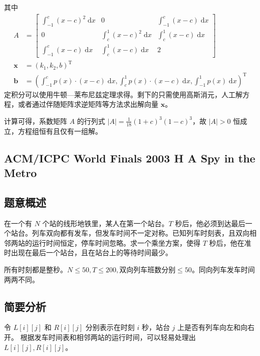 \documentclass{ctexartutf8}
\numberwithin{theorem}{section}
\numberwithin{theorem}{subsection}
\begin{document}
			其中
			\begin{align}
				A & = \begin{bmatrix}
					 \int_{-1}^{c} (x-c)^2 \; \mathrm{d}x & 0 & \int_{-1}^{c} (x-c) \; \mathrm{d}x \\
					0 & \int_{c}^{1} (x-c)^2 \; \mathrm{d}x & \int_{c}^{1} (x-c) \; \mathrm{d}x \\
					\int_{-1}^{c} (x-c) \; \mathrm{d}x & \int_{c}^{1} (x-c) \; \mathrm{d}x & 2
				\end{bmatrix} \\
				\mathbf{x} & = (k_1,k_2,b)^{\mathrm{T}} \\
				\mathbf{b} & = \left(\int_{-1}^{c} p(x)\cdot(x-c) \; \mathrm{d}x,
					\int_{c}^{1} p(x)\cdot(x-c) \; \mathrm{d}x,
					\int_{-1}^{1} p(x) \; \mathrm{d}x\right)^{\mathrm{T}}
			\end{align}
			定积分可以使用牛顿—莱布尼兹定理求得。剩下的只需使用高斯消元，人工解方程，或者通过伴随矩阵求逆矩阵等方法求出解向量 $\mathbf{x}$。
			
			计算可得，系数矩阵 $A$ 的行列式 $\left|A\right| = \textstyle \frac{1}{18} (1+c)^3 (1-c)^3 $，故 $\left|A\right|  > 0 $ 恒成立，方程组恒有且仅有一组解。
			
		
	\subsection{ACM/ICPC World Finals 2003 H A Spy in the Metro}
		\subsection{题意概述}
			在一个有 $N$ 个站的线形地铁里，某人在第一个站台。$T$ 秒后，他必须到达最后一个站台。列车双向都有发车，但发车时间不一定对称。已知列车时刻表，且双向相邻两站的运行时间恒定，停车时间忽略。求一个乘坐方案，使得 $T$ 秒后，他在准时出现在最后一个站台，且在站台上的等待时间最少。
			
			所有时刻都是整秒。$N \le 50, T \le 200, \text{双向列车班数分别} \le 50$。同向列车发车时间两两不同。
		\subsection{简要分析}
			令 $L[i][j]$ 和 $R[i][j]$ 分别表示在时刻 $i$ 秒，站台 $j$ 上是否有列车向左和向右开。
			根据发车时间表和相邻两站的运行时间，可以轻易处理出 $L[i][j], R[i][j]$。
			
\end{document}
